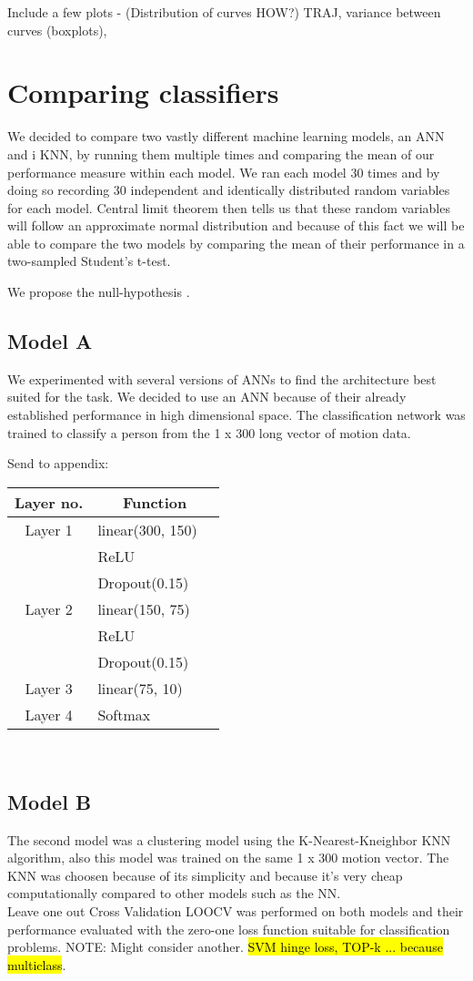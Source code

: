 \documentclass{article}
\begin{document}
Include a few plots - (Distribution of curves HOW?)
TRAJ, variance between curves (boxplots), 

\section{Comparing classifiers}
We decided to compare two vastly different machine learning models, an ANN and i KNN, by running them multiple times and comparing the mean of our performance measure within each model. We ran each model 30 times and by doing so recording 30 independent and identically distributed random variables for each model. Central limit theorem then tells us that these random variables will follow an approximate normal distribution and because of this fact we will be able to compare the two models by comparing the mean of their performance in a two-sampled Student's t-test.

We propose the null-hypothesis . 
\subsection{Model A}
We experimented with several versions of ANNs to find the  architecture best suited for the task. We decided to use an ANN because of their already established performance in high dimensional space. The classification network was trained to classify a person from the 1 x 300 long vector of motion data.   

Send to appendix:
\begin{tabular}[H]{c l @{} l}
\centering
Layer no.       &
\multicolumn{2}{c}{Function} \\
\hline
Layer 1     & linear(300, 150) \\
            & ReLU \\
            & Dropout(0.15) \\
Layer 2     & linear(150, 75) \\ 
            & ReLU \\
            & Dropout(0.15) \\
Layer 3     & linear(75, 10) \\ 
Layer 4     & Softmax\\ 
\end{tabular}\\ 

\subsection{Model B}
The second model was a clustering model using the K-Nearest-Kneighbor KNN algorithm, also this model was trained on the same 1 x 300 motion vector.
The KNN was choosen because of its simplicity and because it's very cheap computationally compared to other models such as the NN.
\\
Leave one out Cross Validation LOOCV was performed on both models and their performance evaluated with the zero-one loss function suitable for classification problems. NOTE: Might consider another. \hl{SVM hinge loss, TOP-k ... because multiclass}.
\end{document}
